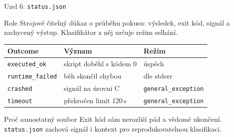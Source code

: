 \documentclass[aspectratio=169,11pt]{beamer}
\begin{document}
\begin{frame}[t]{Uzel 6: \texttt{status.json}}
  \small
  \begin{block}{Role}
    Strojově čitelný důkaz o průběhu pokusu: výsledek, exit kód, signál a
    zachycený výstup. Klasifikátor z něj určuje režim selhání.
  \end{block}

  \begin{table}
    \centering
    \begin{tabular}{@{}lll@{}}
      \toprule
      \textbf{Outcome} & \textbf{Význam} & \textbf{Režim} \\
      \midrule
      \texttt{executed\_ok} & skript doběhl s kódem 0 & úspěch \\
      \texttt{runtime\_failed} & běh skončil chybou & dle stderr \\
      \texttt{crashed} & signál na úrovni C & \texttt{general\_exception} \\
      \texttt{timeout} & překročen limit 120\,s & \texttt{general\_exception} \\
      \bottomrule
    \end{tabular}
  \end{table}

  \begin{alertblock}{Proč samostatný soubor}
    Exit kód sám nerozliší pád a vědomé ukončení. \texttt{status.json} zachová
    signál i kontext pro reprodukovatelnou klasifikaci.
  \end{alertblock}
\end{frame}
\end{document}
